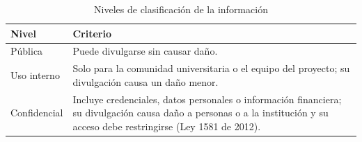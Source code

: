 \documentclass[journal,onecolumn,12pt,draftclsnofoot]{IEEEtran}
\begin{document}
\begin{table}[htbp]
\centering
\caption{Niveles de clasificación de la información}\label{tab:clasificacion}
\small
\setlength{\tabcolsep}{4pt}
\begin{tabular}{|p{}|p{}|}
\hline
\textbf{Nivel} & \textbf{Criterio} \\ \hline
Pública & Puede divulgarse sin causar daño. \\ \hline
Uso interno & Solo para la comunidad universitaria o el equipo del proyecto; su divulgación causa un daño menor. \\ \hline
Confidencial & Incluye credenciales, datos personales o información financiera; su divulgación causa daño a personas o a la institución y su acceso debe restringirse (Ley 1581 de 2012). \\ \hline
\end{tabular}
\end{table}
\end{document}
